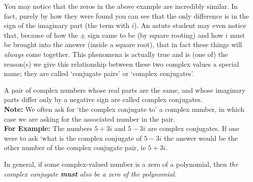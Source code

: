 \documentclass{ximera}
\begin{document}
    You may notice that the zeros in the above example are incredibly similar. In fact, purely by how they were found you can see that the only difference is in the sign of the imaginary part (the term with $i$). An astute student may even notice that, because of how the $\pm$ sign came to be (by square rooting) and how $i$ must be brought into the answer (inside a square root), that in fact these things will \textit{always} come together. This phenomena is actually true and is (one of) the reason(s) we give this relationship between these two complex values a special name; they are called `conjugate pairs' or `complex conjugates'. 
    
    \begin{definition}
        A pair of complex numbers whose real parts are the same, and whose imaginary parts differ only by a negative sign are called complex conjugates. \\
        \textbf{Note:} We often ask for `the complex conjugate to' a complex number, in which case we are asking for the associated number in the pair. \\
        \textbf{For Example:} The numbers $5 + 3i$ and $5 - 3i$ are complex conjugates. If one were to ask `what is the complex conjugate of $5 - 3i$ the answer would be the other number of the complex conjugate pair, ie $5 + 3i$.
    \end{definition} 
    
    
    In general, if some complex-valued number is a zero of a polynomial, then \textit{the complex conjugate \textbf{must} also be a zero of the polynomial}.
\end{document}
